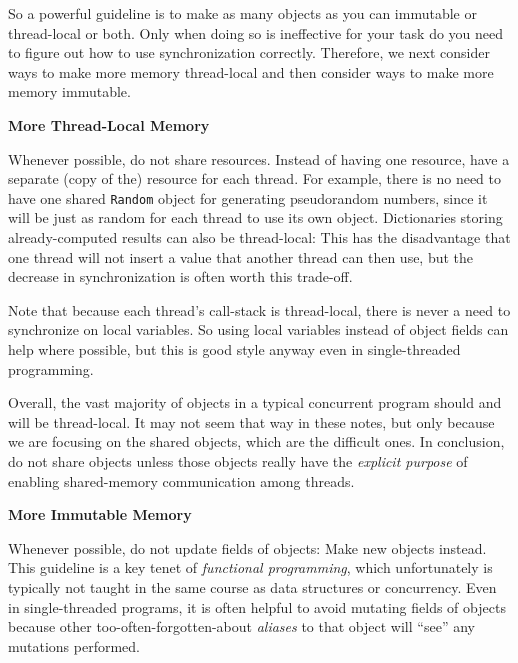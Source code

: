 \documentclass[10pt]{article}
\begin{document}
So a powerful guideline is to make as many objects as you can
immutable or thread-local or both.  Only when doing so is ineffective
for your task do you need to figure out how to use synchronization
correctly.  Therefore, we next consider ways to make more memory
thread-local and then consider ways to make more memory immutable.




\medskip
\noindent\textbf{More Thread-Local Memory}
\medskip

Whenever possible, do not share resources.  Instead of having one
resource, have a separate (copy of the) resource for each thread.  For
example, there is no need to have one shared {\tt Random} object for
generating pseudorandom numbers, since it will be just as random for
each thread to use its own object.  Dictionaries storing
already-computed results can also be thread-local: This has the
disadvantage that one thread will not insert a value that another
thread can then use, but the decrease in synchronization is often
worth this trade-off.

Note that because each thread's call-stack is thread-local, there is
never a need to synchronize on local variables.  So using local
variables instead of object fields can help where possible, but this
is good style anyway even in single-threaded programming.

Overall, the vast majority of objects in a typical concurrent program
should and will be thread-local.  It may not seem that way in these
notes, but only because we are focusing on the shared objects, which
are the difficult ones.  In conclusion, do not share objects unless
those objects really have the \emph{explicit purpose} of enabling
shared-memory communication among threads.

\medskip
\noindent\textbf{More Immutable Memory}
\medskip

Whenever possible, do not update fields of objects: Make new objects
instead.  This guideline is a key tenet of \emph{functional
  programming}, which unfortunately is typically not taught in the
same course as data structures or concurrency.  Even in
single-threaded programs, it is often helpful to avoid mutating fields
of objects because other too-often-forgotten-about \emph{aliases} to
that object will ``see'' any mutations performed.
\end{document}
